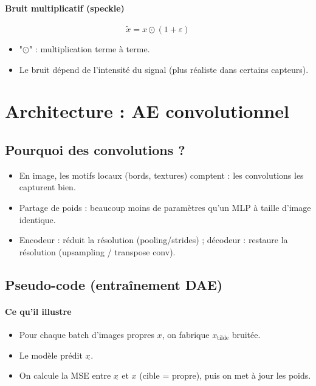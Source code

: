 \documentclass[11pt,a4paper]{article}
\begin{document}
\paragraph{Bruit multiplicatif (speckle)}
\[
  \tilde{x} = x\odot(1+\varepsilon)
\]
\begin{itemize}
  \item "$\odot$" : multiplication terme à terme.
  \item Le bruit dépend de l'intensité du signal (plus réaliste dans certains capteurs).
\end{itemize}

\section{Architecture : AE convolutionnel}

\subsection{Pourquoi des convolutions ?}
\begin{itemize}
  \item En image, les motifs locaux (bords, textures) comptent : les convolutions les capturent bien.
  \item Partage de poids : beaucoup moins de paramètres qu'un MLP à taille d'image identique.
  \item Encodeur : réduit la résolution (pooling/strides) ; décodeur : restaure la résolution (upsampling / transpose conv).
\end{itemize}

\subsection{Pseudo-code (entraînement DAE)}
\paragraph{Ce qu'il illustre}
\begin{itemize}
  \item Pour chaque batch d'images propres $x$, on fabrique $x_{\text{tilde}}$ bruitée.
  \item Le modèle prédit $x_{\hat{}}$.
  \item On calcule la MSE entre $x_{\hat{}}$ et $x$ (cible = propre), puis on met à jour les poids.
\end{itemize}
\end{document}

